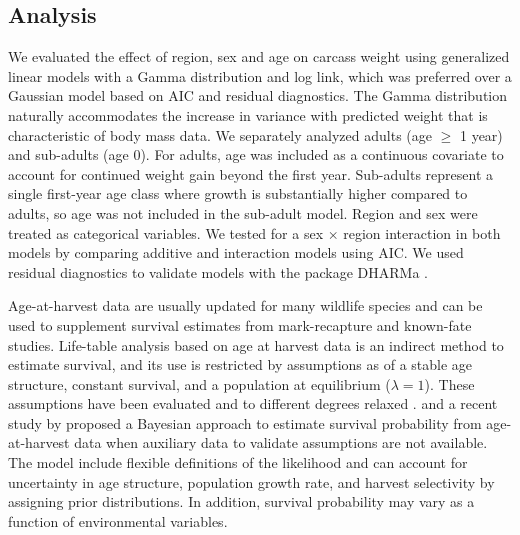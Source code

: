 \documentclass[12pt,a4paper,final,abstract=true,headings=small]{scrartcl}
\begin{document}
\subsection*{Analysis}

We evaluated the effect of region, sex and age on carcass weight using generalized linear models with a Gamma distribution and log link, which was preferred over a Gaussian model based on AIC and residual diagnostics. The Gamma distribution naturally accommodates the increase in variance with predicted weight that is characteristic of body mass data. We separately analyzed adults (age $\geq$ 1 year) and sub-adults (age 0). For adults, age was included as a continuous covariate to account for continued weight gain beyond the first year. Sub-adults represent a single first-year age class where growth is substantially higher compared to adults, so age was not included in the sub-adult model. Region and sex were treated as categorical variables. We tested for a sex $\times$ region interaction in both models by comparing additive and interaction models using AIC. We used residual diagnostics to validate models with the package DHARMa \citep{hartigDHARMaResidualDiagnostics2022}.

Age-at-harvest data are usually updated for many wildlife species and can be used to supplement survival estimates from mark-recapture and known-fate studies. Life-table analysis based on age at harvest data is an indirect method to estimate survival, and its use is restricted by assumptions as of a stable age structure, constant survival, and a population at equilibrium ($\lambda = 1$). These assumptions have been evaluated and to different degrees relaxed \citep{udevitzEstimatingSurvivalRates1998}. and a recent study by \citet{skellyFlexibleBayesianApproach} proposed a Bayesian approach to estimate survival probability from age-at-harvest data when auxiliary data to validate assumptions are not available. The model include flexible definitions of the likelihood and can account for uncertainty in age structure, population growth rate, and harvest selectivity by assigning prior distributions. In addition,  survival probability may vary as a function of environmental variables.
\end{document}
